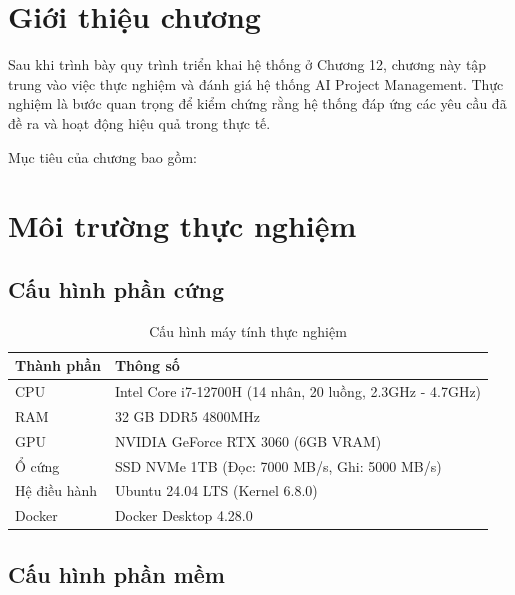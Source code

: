 \documentclass[12pt,a4paper]{report}
\begin{document}
\section{Giới thiệu chương}

Sau khi trình bày quy trình triển khai hệ thống ở Chương 12, chương này tập trung vào việc thực nghiệm và đánh giá hệ thống AI Project Management. Thực nghiệm là bước quan trọng để kiểm chứng rằng hệ thống đáp ứng các yêu cầu đã đề ra và hoạt động hiệu quả trong thực tế.

Mục tiêu của chương bao gồm:
\section{Môi trường thực nghiệm}

\subsection{Cấu hình phần cứng}

\begin{table}[H]
\centering
\caption{Cấu hình máy tính thực nghiệm}
\begin{tabular}{|p{5cm}|p{8cm}|}
\hline
\textbf{Thành phần} & \textbf{Thông số} \\
\hline
CPU & Intel Core i7-12700H (14 nhân, 20 luồng, 2.3GHz - 4.7GHz) \\
\hline
RAM & 32 GB DDR5 4800MHz \\
\hline
GPU & NVIDIA GeForce RTX 3060 (6GB VRAM) \\
\hline
Ổ cứng & SSD NVMe 1TB (Đọc: 7000 MB/s, Ghi: 5000 MB/s) \\
\hline
Hệ điều hành & Ubuntu 24.04 LTS (Kernel 6.8.0) \\
\hline
Docker & Docker Desktop 4.28.0 \\
\hline
\end{tabular}
\label{tab:hw_config}
\end{table}

\subsection{Cấu hình phần mềm}
\end{document}
